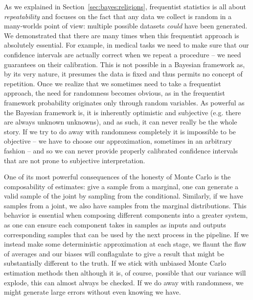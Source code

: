 As we explained in Section~\ref{sec:bayes:religions},
frequentist statistics is all about \emph{repeatability} and focuses on the fact that any data we collect is random
in a many-worlds point of view: multiple possible
datasets \emph{could} have been generated.  We demonstrated that there are many times when this frequentist
approach is absolutely essential.  For example, in medical tasks we need
to make sure that our confidence intervals are actually correct when we repeat a procedure -- we need guarantees on
their calibration.  This is not possible in a Bayesian framework as, by its very nature, it presumes the data
is fixed and thus permits no concept of repetition.  Once we realize that we sometimes need to take a frequentist
approach, the need for randomness becomes obvious, as in the frequentist framework probability originates only
through random variables.  As powerful as the Bayesian framework is, it is inherently optimistic and subjective
(e.g. there are always unknown unknowns), and as such, it can never really be the whole story.  If we try to
do away with randomness completely it is impossible to be objective -- we have to choose our approximation, sometimes
in an arbitrary fashion -- and so we can never provide properly calibrated confidence 
intervals that are not prone to subjective interpretation.

One of its most powerful consequences of the honesty of Monte Carlo is the composability
of estimates: give a sample from a marginal, one can generate a valid sample of the joint by sampling from the
conditional.  Similarly, if we have samples from a joint, we also have samples from the marginal distributions.  This behavior
is essential when composing different components into a greater system, as one can ensure each component takes in
samples as inputs and outputs corresponding samples that can be used by the next process in the pipeline.
If we instead make some deterministic approximation at each stage, we flaunt the flaw of averages and our biases
will conflagulate to give a result that might be substantially different to the truth.  If we stick with unbiased Monte Carlo estimation
methods then although it is, of course, possible that our variance will explode, this can almost always be checked.
If we do away with randomness, we might generate large errors without even knowing we have.


